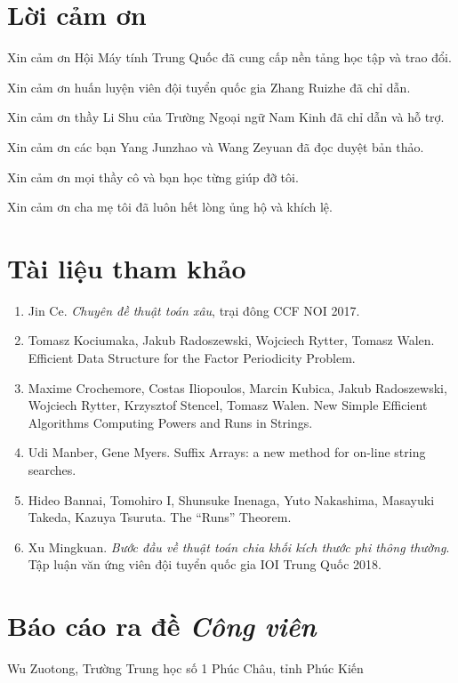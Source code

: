 \documentclass[11pt]{article}
\begin{document}
\section*{Lời cảm ơn}

Xin cảm ơn Hội Máy tính Trung Quốc đã cung cấp nền tảng học tập và trao đổi.

Xin cảm ơn huấn luyện viên đội tuyển quốc gia Zhang Ruizhe đã chỉ dẫn.

Xin cảm ơn thầy Li Shu của Trường Ngoại ngữ Nam Kinh đã chỉ dẫn và hỗ trợ.

Xin cảm ơn các bạn Yang Junzhao và Wang Zeyuan đã đọc duyệt bản thảo.

Xin cảm ơn mọi thầy cô và bạn học từng giúp đỡ tôi.

Xin cảm ơn cha mẹ tôi đã luôn hết lòng ủng hộ và khích lệ.

\section*{Tài liệu tham khảo}

\begin{enumerate}
  \item Jin Ce. \emph{Chuyên đề thuật toán xâu}, trại đông CCF NOI 2017.
  \item Tomasz Kociumaka, Jakub Radoszewski, Wojciech Rytter, Tomasz Walen.
        Efficient Data Structure for the Factor Periodicity Problem.
  \item Maxime Crochemore, Costas Iliopoulos, Marcin Kubica, Jakub
        Radoszewski, Wojciech Rytter, Krzysztof Stencel, Tomasz Walen.
        New Simple Efficient Algorithms Computing Powers and Runs in Strings.
  \item Udi Manber, Gene Myers. Suffix Arrays: a new method for on-line string
        searches.
  \item Hideo Bannai, Tomohiro I, Shunsuke Inenaga, Yuto Nakashima, Masayuki
        Takeda, Kazuya Tsuruta. The ``Runs'' Theorem.
  \item Xu Mingkuan. \emph{Bước đầu về thuật toán chia khối kích thước phi
        thông thường}. Tập luận văn ứng viên đội tuyển quốc gia IOI Trung
        Quốc 2018.
\end{enumerate}

\clearpage
\section*{Báo cáo ra đề \emph{Công viên}}

\begin{center}
Wu Zuotong, Trường Trung học số 1 Phúc Châu, tỉnh Phúc Kiến
\end{center}
\end{document}
